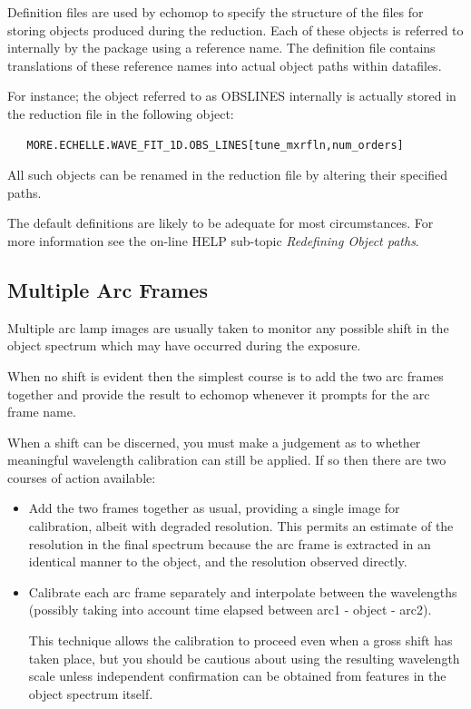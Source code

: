 \documentclass[twoside,11pt]{article}
\newcommand{\xlabel}[1]{}
\renewcommand{\_}{\texttt{\symbol{95}}}
\newcommand{\mlabel}[1]{\xlabel{#1}\label{#1}}
\newcommand{\myindex}[1]{\index{#1}}
\newcommand{\myindex}[1]{}
\begin{document}
Definition files are used by {\sc echomop} to specify the structure of the
files for storing objects produced during the reduction.
Each of these objects is referred to internally by the package using a
reference name.  The definition file contains translations of these
reference names into actual object paths within datafiles.

For instance; the object referred to as OBS\_LINES internally is
actually stored in the reduction file in the following object:

\begin{verbatim}
   MORE.ECHELLE.WAVE_FIT_1D.OBS_LINES[tune_mxrfln,num_orders]
\end{verbatim}

All such objects can be renamed in the reduction file by altering their
specified paths.

The default definitions are likely to be adequate for most
circumstances.  For more information see the on-line HELP sub-topic
{\sl Redefining Object paths}.

\subsection{\mlabel{multi_arc_frames}Multiple Arc Frames}
\myindex{Arc frames!multiple}

Multiple arc lamp images are usually taken to monitor any possible shift
in the object spectrum which may have occurred during the exposure.

When no shift is evident then the simplest course is to add the two arc
frames together and provide the result to {\sc echomop} whenever it
prompts for the arc frame name.

When a shift can be discerned, you must make a judgement as to
whether meaningful wavelength calibration can still be applied. If so
then there are two courses of action available:

\begin{itemize}

\item Add the two frames together as usual, providing a single image for
calibration, albeit with degraded resolution. This permits an  estimate
of the resolution in the final spectrum because the arc frame is
extracted in an identical manner to the object,  and the resolution
observed directly.

\item Calibrate each arc frame separately and interpolate between the
wavelengths (possibly taking into account time elapsed between arc1 -
object - arc2).

This technique allows the calibration to proceed even when a gross shift
has taken place, but you should be cautious about using the resulting
wavelength scale unless independent confirmation can be obtained from
features in the object spectrum itself.

\end{itemize}
\end{document}
